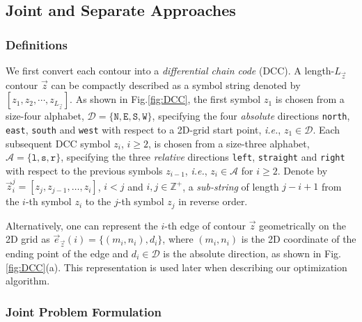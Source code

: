 \subsection{Joint and Separate Approaches}
\label{subsec:analysis_jointSeparate}

\subsubsection{Definitions}

We first convert each contour into a \textit{differential chain code} (DCC)\cite{freeman1978application}.
A length-$L_{\vec{z}}$ contour $\vec{z}$ can be compactly described as a symbol string denoted by $[z_1,z_2,\cdots,z_{L_{\vec{z}}}]$.
As shown in Fig.\;\ref{fig:DCC}, the first symbol $z_1$ is chosen from a size-four alphabet, $\mathcal{D}=\{\texttt{N},\texttt{E},\texttt{S},\texttt{W}\}$, specifying the four \textit{absolute} directions \texttt{north}, \texttt{east}, \texttt{south} and \texttt{west} with respect to a 2D-grid start point, \textit{i.e.}, $z_1\in \mathcal{D}$. 
Each subsequent DCC symbol $z_i$, $i\geq 2$, is chosen from a size-three alphabet, $\mathcal{A}=\{\texttt{l}, \texttt{s}, \texttt{r}\}$, specifying the three \textit{relative} directions \texttt{left}, \texttt{straight} and \texttt{right} with respect to the previous symbols $z_{i-1}$, \textit{i.e.}, $z_i\in \mathcal{A}$ for $i\geq 2$.
Denote by $\vec{z}^{j}_{i} = [{z}_{j},{z}_{j-1},\ldots,{z}_{i}]$, $i<j$ and $i,j \in \mathbb{Z}^+$, a \textit{sub-string} of length $j-i+1$ from the $i$-th symbol $z_i$ to the $j$-th symbol $z_j$ in reverse order. 

Alternatively, one can represent the $i$-th edge of contour $\vec{z}$ geometrically on the 2D grid as $\vec{e}_{\vec{z}}(i)=\{(m_i,n_i), d_i\}$, where $(m_i, n_i)$ is the 2D coordinate of the ending point of the edge and $d_i \in \mathcal{D}$ is the absolute direction, as shown in Fig.\;\ref{fig:DCC}(a).
This representation is used later when describing our optimization algorithm.


\subsubsection{Joint Problem Formulation}

